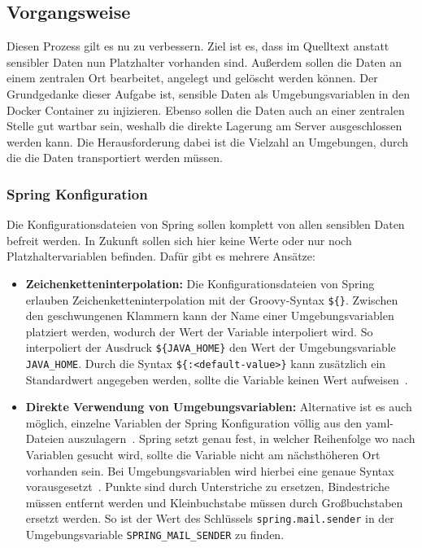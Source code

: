 \subsection{Vorgangsweise}

Diesen Prozess gilt es nu zu verbessern. Ziel ist es, dass im Quelltext anstatt sensibler Daten nun Platzhalter vorhanden sind. Außerdem sollen die Daten an einem zentralen Ort bearbeitet, angelegt und gelöscht werden können. Der Grundgedanke dieser Aufgabe ist, sensible Daten als Umgebungsvariablen in den Docker Container zu injizieren. Ebenso sollen die Daten auch an einer zentralen Stelle gut wartbar sein, weshalb die direkte Lagerung am Server ausgeschlossen werden kann. Die Herausforderung dabei ist die Vielzahl an Umgebungen, durch die die Daten transportiert werden müssen.

\subsubsection{Spring Konfiguration}

Die Konfigurationsdateien von Spring sollen komplett von allen sensiblen Daten befreit werden. In Zukunft sollen sich hier keine Werte oder nur noch Platzhaltervariablen befinden. Dafür gibt es mehrere Ansätze:

\begin{itemize}
    \item \textbf{Zeichenketteninterpolation:} Die Konfigurationsdateien von Spring erlauben Zeichenketteninterpolation mit der Groovy-Syntax \texttt{\$\{\}}. Zwischen den geschwungenen Klammern kann der Name einer Umgebungsvariablen platziert werden, wodurch der Wert der Variable interpoliert wird. So interpoliert der Ausdruck \texttt{\$\{JAVA\_HOME\}} den Wert der Umgebungsvariable \texttt{JAVA\_HOME}. Durch die Syntax \texttt{\$\{<variable-name>:<default-value>\}} kann zusätzlich ein Standardwert angegeben werden, sollte die Variable keinen Wert aufweisen~\parencite{springpropertyplaceholder}.
    \item \textbf{Direkte Verwendung von Umgebungsvariablen:} Alternative ist es auch möglich, einzelne Variablen der Spring Konfiguration völlig aus den yaml-Dateien auszulagern~\parencite{springexternalizedconfig}. Spring setzt genau fest, in welcher Reihenfolge wo nach Variablen gesucht wird, sollte die Variable nicht am nächsthöheren Ort vorhanden sein. Bei Umgebungsvariablen wird hierbei eine genaue Syntax vorausgesetzt~\parencite{springbindingenvvariables}. Punkte sind durch Unterstriche zu ersetzen, Bindestriche müssen entfernt werden und Kleinbuchstabe müssen durch Großbuchstaben ersetzt werden. So ist der Wert des Schlüssels \texttt{spring.mail.sender} in der Umgebungsvariable \texttt{SPRING\_MAIL\_SENDER} zu finden.
\end{itemize}

